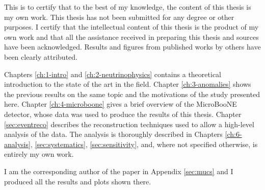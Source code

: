 This is to certify that to the best of my knowledge, the content of this thesis is my own work. This thesis has not been submitted for any degree or other purposes.
I certify that the intellectual content of this thesis is the product of my own work and that all the assistance received in preparing this thesis and sources have been acknowledged. Results and figures from published works by others have been clearly attributed.

Chapters \ref{ch:1-intro} and \ref{ch:2-neutrinophysics} contains a theoretical introduction to the state of the art in the field. Chapter \ref{ch:3-anomalies} shows the previous results on the same topic and the motivations of the study presented here. Chapter \ref{ch:4-microboone} gives a brief overview of the MicroBooNE detector, whose data was used to produce the results of this thesis. 
Chapter \ref{sec:eventreco} describes the reconstruction techniques used to allow a high-level analysis of the data. The analysis is thoroughly described in Chapters \ref{ch:6-analysis}, \ref{sec:systematics}, \ref{sec:sensitivity}, and, where not specified otherwise, is entirely my own work.

I am the corresponding author of the paper in Appendix \ref{sec:mucs} and I produced all the results and plots shown there.